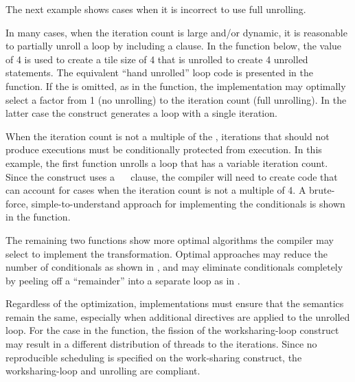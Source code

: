The next example shows cases when it is incorrect to use full unrolling.


In many cases, when the iteration count is large and/or dynamic, it is
reasonable to partially unroll a loop by including a  clause.
In the  function below, the  value
of 4 is used to create a tile size of 4 that is unrolled to create 4 unrolled statements.
The equivalent ``hand unrolled'' loop code is presented in the 
 function.
If the  is omitted, as in the  
function, the implementation may optimally select a factor from 1 
(no unrolling) to the iteration count (full unrolling).  
In the latter case the construct generates a loop with a single iteration.


When the iteration count is not a multiple of the ,
iterations that should not produce executions must be conditionally
protected from execution. In this example, the first function
unrolls a loop that has a variable iteration count. Since the 
construct uses a ~~\code{)} clause, the compiler will need to
create code that can account for cases when the iteration count is not a
multiple of 4. A brute-force, simple-to-understand approach for implementing 
the conditionals is shown in the  function.

The remaining two functions show more optimal algorithms the compiler 
may select to implement the transformation.
Optimal approaches may reduce the number of conditionals as shown in 
, and 
may eliminate conditionals completely by peeling off a ``remainder'' 
into a separate loop as in . 

Regardless of the optimization, implementations must ensure that the semantics
remain the same, especially when additional directives are applied to
the unrolled loop. For the case in the 
function, the fission of the worksharing-loop construct may result in a different
distribution of threads to the iterations. Since no reproducible scheduling
is specified on the work-sharing construct, the worksharing-loop and unrolling are compliant.

